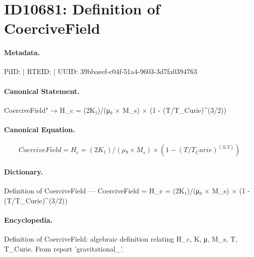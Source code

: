 \section*{ID10681: Definition of CoerciveField}
\paragraph{Metadata.}
PiID:  | RTEID:  | UUID: 39bbaeef-c04f-51a4-9603-3d7fa0394763

\paragraph{Canonical Statement.}
CoerciveField" → H\_c = (2K₁)/(μ₀ × M\_s) × (1 - (T/T\_Curie)\textasciicircum{}(3/2))

\paragraph{Canonical Equation.}
\[
CoerciveField = H_c = (2K₁)/(μ₀ × M_s) × (1 - (T/T_Curie)^(3/2))
\]

\paragraph{Dictionary.}
Definition of CoerciveField — CoerciveField = H\_c = (2K₁)/(μ₀ × M\_s) × (1 - (T/T\_Curie)\textasciicircum{}(3/2))

\paragraph{Encyclopedia.}
Definition of CoerciveField: algebraic definition relating H\_c, K, μ, M\_s, T, T\_Curie. From report 'gravitational\_'.
